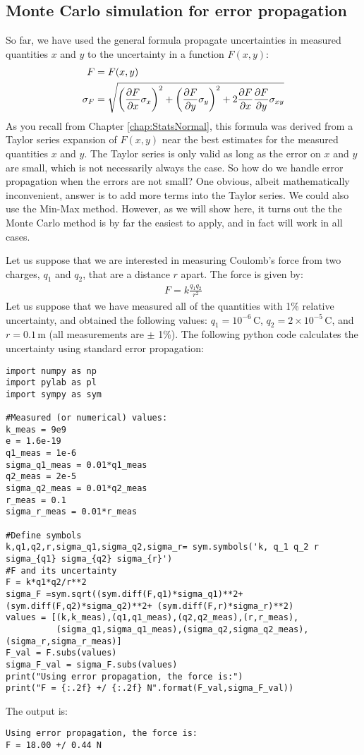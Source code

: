 \subsection{Monte Carlo simulation for error propagation}
So far, we have used the general formula propagate uncertainties in measured quantities $x$ and $y$ to the uncertainty in a function $F(x,y)$:
\begin{align}
F&=F(x,y)\nonumber\\
\sigma_{F} &= \sqrt{\left(\frac{\partial F}{\partial x}\sigma_x\right)^2 + \left(\frac{\partial F}{\partial y} \sigma_y\right)^2+2\frac{\partial F}{\partial x}\frac{\partial F}{\partial y}\sigma_{xy}}
\end{align}
As you recall from Chapter \ref{chap:StatsNormal}, this formula was derived from a Taylor series expansion of $F(x,y)$ near the best estimates for the measured quantities $x$ and $y$. The Taylor series is only valid as long as the error on $x$ and $y$ are small, which is not necessarily always the case. So how do we handle error propagation when the errors are not small? One obvious, albeit mathematically inconvenient, answer is to add more terms into the Taylor series. We could also use the Min-Max method. However, as we will show here, it turns out the the Monte Carlo method is by far the easiest to apply, and in fact will work in all cases.

Let us suppose that we are interested in measuring Coulomb's force from two charges, $q_1$ and $q_2$, that are a distance $r$ apart. The force is given by:
\begin{align*}
F = k\frac{q_1q_2}{r^2}
\end{align*}
Let us suppose that we have measured all of the quantities with 1\% relative uncertainty, and obtained the following values: $q_1 =10^{-6}$\,C, $q_2 =2\times10^{-5}$\,C, and $r=0.1$\,m (all measurements are $\pm$ 1\%). The following python code calculates the uncertainty using standard error propagation:
\begin{lstlisting}[frame=single] 
import numpy as np
import pylab as pl
import sympy as sym

#Measured (or numerical) values:
k_meas = 9e9
e = 1.6e-19
q1_meas = 1e-6
sigma_q1_meas = 0.01*q1_meas
q2_meas = 2e-5
sigma_q2_meas = 0.01*q2_meas
r_meas = 0.1
sigma_r_meas = 0.01*r_meas

#Define symbols
k,q1,q2,r,sigma_q1,sigma_q2,sigma_r= sym.symbols('k, q_1 q_2 r sigma_{q1} sigma_{q2} sigma_{r}')
#F and its uncertainty
F = k*q1*q2/r**2
sigma_F =sym.sqrt((sym.diff(F,q1)*sigma_q1)**2+ (sym.diff(F,q2)*sigma_q2)**2+ (sym.diff(F,r)*sigma_r)**2)
values = [(k,k_meas),(q1,q1_meas),(q2,q2_meas),(r,r_meas),
          (sigma_q1,sigma_q1_meas),(sigma_q2,sigma_q2_meas),(sigma_r,sigma_r_meas)]
F_val = F.subs(values)
sigma_F_val = sigma_F.subs(values)
print("Using error propagation, the force is:")
print("F = {:.2f} +/ {:.2f} N".format(F_val,sigma_F_val))

\end{lstlisting}
The output is:
\begin{verbatim}
Using error propagation, the force is:
F = 18.00 +/ 0.44 N
\end{verbatim}

